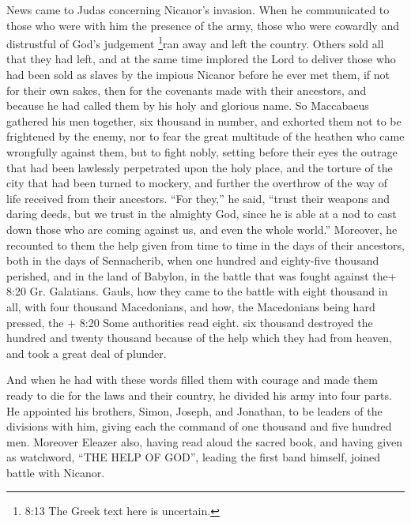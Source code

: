  News came to Judas concerning Nicanor's invasion. When he
communicated to those who were with him the presence of the army,
 those who were cowardly and distrustful of God's judgement
\footnote{8:13 The Greek text here is uncertain.}ran away and left the
country.  Others sold all that they had left, and at the
same time implored the Lord to deliver those who had been sold as slaves
by the impious Nicanor before he ever met them,  if not for
their own sakes, then for the covenants made with their ancestors, and
because he had called them by his holy and glorious name. 
So Maccabaeus gathered his men together, six thousand in number, and
exhorted them not to be frightened by the enemy, nor to fear the great
multitude of the heathen who came wrongfully against them, but to fight
nobly,  setting before their eyes the outrage that had been
lawlessly perpetrated upon the holy place, and the torture of the city
that had been turned to mockery, and further the overthrow of the way of
life received from their ancestors.  ``For they,'' he said,
``trust their weapons and daring deeds, but we trust in the almighty
God, since he is able at a nod to cast down those who are coming against
us, and even the whole world.''  Moreover, he recounted to
them the help given from time to time in the days of their ancestors,
both in the days of Sennacherib, when one hundred and eighty-five
thousand perished,  and in the land of Babylon, in the
battle that was fought against the+ 8:20 Gr. Galatians. Gauls, how they
came to the battle with eight thousand in all, with four thousand
Macedonians, and how, the Macedonians being hard pressed, the + 8:20
Some authorities read eight. six thousand destroyed the hundred and
twenty thousand because of the help which they had from heaven, and took
a great deal of plunder.

 And when he had with these words filled them with courage
and made them ready to die for the laws and their country, he divided
his army into four parts.  He appointed his brothers,
Simon, Joseph, and Jonathan, to be leaders of the divisions with him,
giving each the command of one thousand and five hundred men.
 Moreover Eleazer also, having read aloud the sacred book,
and having given as watchword, ``THE HELP OF GOD'', leading the first
band himself, joined battle with Nicanor.

